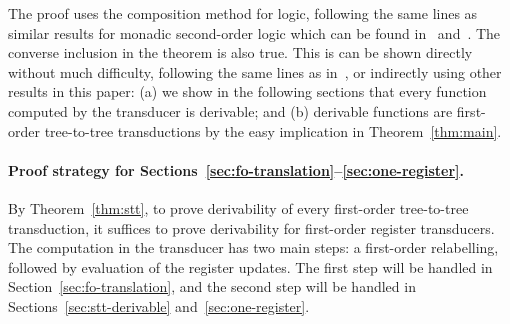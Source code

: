 The proof uses the composition method for logic,  following the same lines as  similar results for monadic second-order logic which can be found in~\cite[Theorem 4.6]{alur2017streaming} and~\cite[Theorem 14]{bloem_comparison_2000}. 
The converse  inclusion in the  theorem is also true. This is can be shown directly without much difficulty, following the same lines as in~\cite[Section 5]{bloem_comparison_2000}, or indirectly using   other results in this paper: (a) we show in the following sections that every function computed by the transducer is derivable; and (b)  derivable functions are first-order tree-to-tree transductions by the easy implication in Theorem~\ref{thm:main}.

\paragraph*{Proof strategy for Sections~\ref{sec:fo-translation}--\ref{sec:one-register}.} By Theorem~\ref{thm:stt}, to prove derivability of  every first-order tree-to-tree transduction, it suffices to prove derivability for first-order register transducers. The computation in the transducer has two main steps: a first-order relabelling, followed by evaluation of the register updates. The first step will be handled in Section~\ref{sec:fo-translation}, and the second step will be handled in Sections~\ref{sec:stt-derivable} and~\ref{sec:one-register}.






